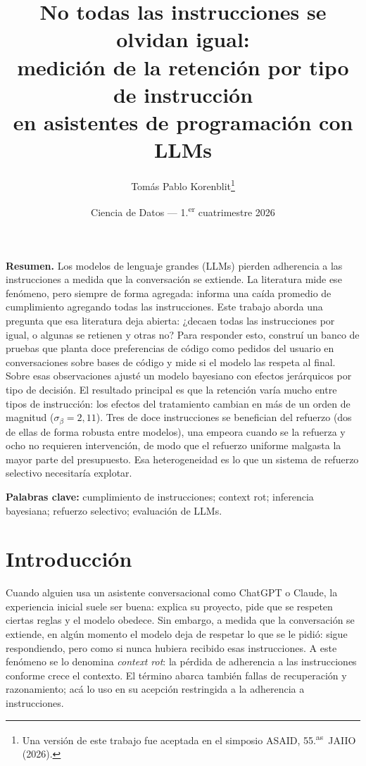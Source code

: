 \documentclass[12pt]{article}
\title{\vspace{-2.2em}\bfseries No todas las instrucciones se olvidan igual:\\
medición de la retención por tipo de instrucción\\ en asistentes de programación con LLMs}
\author{Tomás Pablo Korenblit\thanks{Una versión de este trabajo fue aceptada en el simposio ASAID, 55.\textsuperscript{as}~JAIIO (2026).}}
\date{Ciencia de Datos --- 1.\textsuperscript{er} cuatrimestre 2026}
\begin{document}
\maketitle
\vspace{-1.8em}

\begin{center}
\begin{minipage}{0.92\textwidth}
\small
\noindent\textbf{Resumen.} Los modelos de lenguaje grandes (LLMs) pierden
adherencia a las instrucciones a medida que la conversación se extiende. La
literatura mide ese fenómeno, pero siempre de forma agregada: informa una caída
promedio de cumplimiento agregando todas las instrucciones. Este trabajo aborda
una pregunta que esa literatura deja abierta: ¿decaen todas las instrucciones por
igual, o algunas se retienen y otras no? Para responder esto, construí un banco de
pruebas que planta doce preferencias de código como pedidos del usuario en
conversaciones sobre bases de código y mide si el modelo las respeta al final.
Sobre esas observaciones ajusté un modelo bayesiano con efectos jerárquicos por
tipo de decisión. El resultado principal es que la retención varía mucho entre
tipos de instrucción: los efectos del tratamiento cambian en más de un orden de
magnitud ($\sigma_\beta = 2{,}11$). Tres de doce instrucciones se benefician del
refuerzo (dos de ellas de forma robusta entre modelos), una empeora cuando se la
refuerza y ocho no requieren intervención, de modo que el refuerzo uniforme
malgasta la mayor parte del presupuesto. Esa heterogeneidad es lo que un sistema
de refuerzo selectivo necesitaría explotar.

\vspace{0.3em}
\noindent\textbf{Palabras clave:} cumplimiento de instrucciones; context rot;
inferencia bayesiana; refuerzo selectivo; evaluación de LLMs.
\end{minipage}
\end{center}

\vspace{0.5em}

\section{Introducción}

Cuando alguien usa un asistente conversacional como ChatGPT o Claude, la
experiencia inicial suele ser buena: explica su proyecto, pide que se respeten
ciertas reglas y el modelo obedece. Sin embargo, a medida que la conversación se
extiende, en algún momento el modelo deja de respetar lo que se le pidió: sigue
respondiendo, pero como si nunca hubiera recibido esas instrucciones. A este
fenómeno se lo denomina \emph{context rot}: la pérdida de adherencia a las
instrucciones conforme crece el contexto. El término abarca también fallas de
recuperación y razonamiento; acá lo uso en su acepción restringida a la adherencia
a instrucciones.
\end{document}
